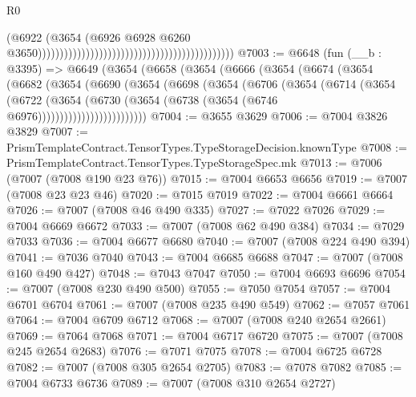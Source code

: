 \begin{lexlean}{R0}
\begin{coremodule}
                                                                                        (@6922
                                                                                          (@3654
                                                                                            (@6926
                                                                                              @6928
                                                                                              @6260
                                                                                              @3650)))))))))))))))))))))))))))))))))))))))))))))
@7003 := @6648
    (fun (__b : @3395) =>
    @6649
      (@3654
        (@6658
          (@3654
            (@6666
              (@3654
                (@6674
                  (@3654
                    (@6682
                      (@3654
                        (@6690
                          (@3654
                            (@6698
                              (@3654
                                (@6706
                                  (@3654
                                    (@6714
                                      (@3654
                                        (@6722
                                          (@3654
                                            (@6730
                                              (@3654
                                                (@6738 (@3654 (@6746 @6976)))))))))))))))))))))))))
@7004 := @3655 @3629
@7006 := @7004 @3826 @3829
@7007 := PrismTemplateContract.TensorTypes.TypeStorageDecision.knownType
@7008 := PrismTemplateContract.TensorTypes.TypeStorageSpec.mk
@7013 := @7006 (@7007 (@7008 @190 @23 @76))
@7015 := @7004 @6653 @6656
@7019 := @7007 (@7008 @23 @23 @46)
@7020 := @7015 @7019
@7022 := @7004 @6661 @6664
@7026 := @7007 (@7008 @46 @490 @335)
@7027 := @7022 @7026
@7029 := @7004 @6669 @6672
@7033 := @7007 (@7008 @62 @490 @384)
@7034 := @7029 @7033
@7036 := @7004 @6677 @6680
@7040 := @7007 (@7008 @224 @490 @394)
@7041 := @7036 @7040
@7043 := @7004 @6685 @6688
@7047 := @7007 (@7008 @160 @490 @427)
@7048 := @7043 @7047
@7050 := @7004 @6693 @6696
@7054 := @7007 (@7008 @230 @490 @500)
@7055 := @7050 @7054
@7057 := @7004 @6701 @6704
@7061 := @7007 (@7008 @235 @490 @549)
@7062 := @7057 @7061
@7064 := @7004 @6709 @6712
@7068 := @7007 (@7008 @240 @2654 @2661)
@7069 := @7064 @7068
@7071 := @7004 @6717 @6720
@7075 := @7007 (@7008 @245 @2654 @2683)
@7076 := @7071 @7075
@7078 := @7004 @6725 @6728
@7082 := @7007 (@7008 @305 @2654 @2705)
@7083 := @7078 @7082
@7085 := @7004 @6733 @6736
@7089 := @7007 (@7008 @310 @2654 @2727)

\end{coremodule}
\end{lexlean}
